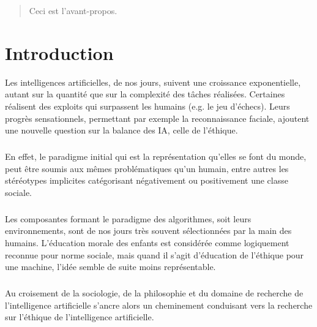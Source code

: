 \documentclass[10pt, french, a4paper]{report}
\begin{document}
\newpage
\setcounter{tocdepth}{3}
\tableofcontents

\newpage
\begin{abstract}

    Ceci est l'avant-propos.

\end{abstract}


\newpage
\chapter*{Introduction}

Les intelligences artificielles, de nos jours, suivent une croissance exponentielle, autant sur la quantité que sur la complexité des tâches réalisées. Certaines réalisent des exploits qui surpassent les humains (e.g. le jeu d’échecs). Leurs progrès sensationnels, permettant par exemple la reconnaissance faciale, ajoutent une nouvelle question sur la balance des IA, celle de l’éthique.

\paragraph{}
En effet, le paradigme initial qui est la représentation qu’elles se font du monde, peut être soumis aux mêmes problématiques qu’un humain, entre autres les stéréotypes implicites catégorisant négativement ou positivement une classe sociale.

\paragraph{}
Les composantes formant le paradigme des algorithmes, soit leurs environnements, sont de nos jours très souvent sélectionnées par la main des humains. L’éducation morale des enfants est considérée comme logiquement reconnue pour norme sociale, mais quand il s’agit d’éducation de l’éthique pour une machine, l’idée semble de suite moins représentable.

\paragraph{}
Au croisement de la sociologie, de la philosophie et du domaine de recherche de l’intelligence artificielle s’ancre alors un cheminement conduisant vers la recherche sur l’éthique de l’intelligence artificielle.
\end{document}
